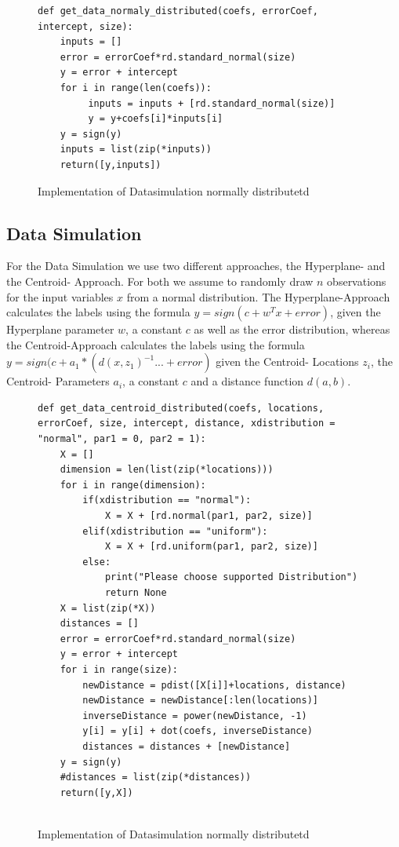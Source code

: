 \documentclass[letterpaper]{article}
\begin{document}
\begin{figure}[!htb]
\begin{center}
\begin{lstlisting}
def get_data_normaly_distributed(coefs, errorCoef, intercept, size):
	inputs = []
	error = errorCoef*rd.standard_normal(size)
	y = error + intercept
	for i in range(len(coefs)):
		 inputs = inputs + [rd.standard_normal(size)]		 
		 y = y+coefs[i]*inputs[i]
	y = sign(y)
	inputs = list(zip(*inputs))
	return([y,inputs])
\end{lstlisting}
\caption{Implementation of Datasimulation normally distributetd}
\label{fig1}
\end{center}
\end{figure}
\subsection{Data Simulation}
For the Data Simulation we use two different approaches, the Hyperplane- and the Centroid- Approach. For both we assume to randomly draw $n$ observations for the input variables $x$ from a normal distribution. The Hyperplane-Approach calculates the labels using the formula $y= sign(c+ w^T x + error)$, given the Hyperplane parameter $w$, a constant $c$ as well as the error distribution, whereas the Centroid-Approach calculates the labels using the formula $y= sign(c + a_1*(d(x,z_1)^{-1}... + error)$ given the Centroid- Locations $z_i$, the Centroid- Parameters  $a_i$, a constant $c$ and a distance function $d(a,b)$.


\begin{figure}[!htb]
\begin{center}
\begin{lstlisting}
def get_data_centroid_distributed(coefs, locations, errorCoef, size, intercept, distance, xdistribution = "normal", par1 = 0, par2 = 1):
	X = []
	dimension = len(list(zip(*locations)))
	for i in range(dimension):
		if(xdistribution == "normal"):		
			X = X + [rd.normal(par1, par2, size)]
		elif(xdistribution == "uniform"):
			X = X + [rd.uniform(par1, par2, size)]
		else:
			print("Please choose supported Distribution")
			return None	
	X = list(zip(*X))
	distances = []
	error = errorCoef*rd.standard_normal(size)
	y = error + intercept
	for i in range(size):	
		newDistance = pdist([X[i]]+locations, distance)
		newDistance = newDistance[:len(locations)]
		inverseDistance = power(newDistance, -1)
		y[i] = y[i] + dot(coefs, inverseDistance)
		distances = distances + [newDistance]
	y = sign(y)
	#distances = list(zip(*distances))
	return([y,X])	
	
\end{lstlisting}
\caption{Implementation of Datasimulation normally distributetd}
\label{fig1}
\end{center}
\end{figure}
\end{document}

